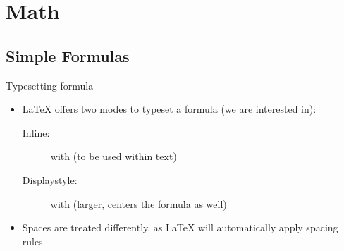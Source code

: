 \section{Math}
\subsection{Simple Formulas}

\begin{frame}{Typesetting formula}
   \soldisablenumhl\begin{itemize}
      \item \LaTeX{} offers two modes to typeset a formula (we are interested in):
      \begin{description}
         \item[Inline:] with  (to be used within text)
         \item[Displaystyle:] with \blatex{\\[a + b\\]} (larger, centers the formula as well)
      \end{description}
      \item Spaces are treated differently, as \LaTeX{} will automatically apply spacing rules
   \end{itemize}
\end{frame}